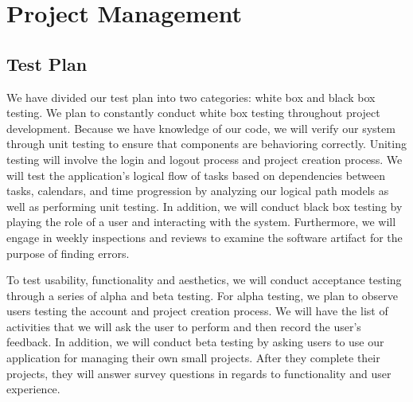 \chapter{Project Management}

\section{Test Plan}
We have divided our test plan into two categories: white box and black box testing. We plan to constantly conduct white box testing throughout project development. Because we have knowledge of our code, we will verify our system through unit testing to ensure that components are behavioring correctly. Uniting testing will involve the login and logout process and project creation process. We will test the application’s logical flow of tasks based on dependencies between tasks, calendars, and time progression by analyzing our logical path models as well as performing unit testing. In addition, we will conduct black box testing by playing the role of a user and interacting with the system. Furthermore, we will engage in weekly inspections and reviews to examine the software artifact for the purpose of finding errors. \par To test usability, functionality and aesthetics, we will conduct acceptance testing through a series of alpha and beta testing. For alpha testing, we plan to observe users testing the account and project creation process. We will have the list of activities that we will ask the user to perform and then record the user’s feedback. In addition, we will conduct beta testing by asking users to use our application for managing their own small projects. After they complete their projects, they will answer survey questions in regards to functionality and user experience.

